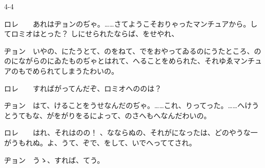 \documentclass[tate,paper=b6j,jafontsize=9pt]{jlreq}
\begin{document}
\begin{azconvIndented}{4\zw}{-4\zw}

ロレ　　あれはヂョンのぢゃ。……さてようこそおりゃったマンチュアから。してロミオはとった？ しにせられたならば、をせやれ、

ヂョン　いやの、にたうとて、のをねて、でをおやってゐるのにうたところ、ののにながらのにゐたものぢゃとはれて、へることをめられた、それゆゑマンチュアのもでめられてしまうたわいの。

ロレ　　すればがってんだぞ、ロミオへののは？

ヂョン　はて、けることをうせなんだのぢゃ。……これ、りってった。……へけうとうてもな、がをがりをるによって、のさへもへなんだわいの。

ロレ　　はれ、それはのの！ 、なならぬの、それがになったは、どのやうな一がうもれぬ。よ、うて、ぞで、をして、いでへっててされ。

ヂョン　うゝ、すれば、てう。

\end{azconvIndented}
\end{document}
